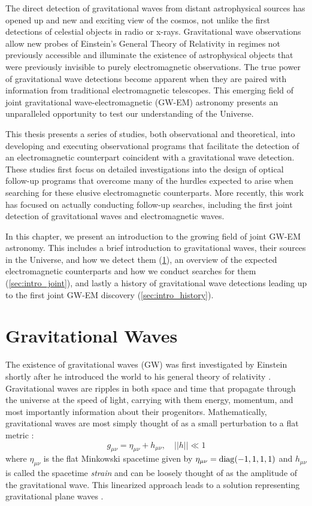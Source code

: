 The direct detection of gravitational waves from distant astrophysical sources has opened up and new and exciting view of the cosmos, not unlike the first detections of celestial objects in radio or x-rays. Gravitational wave observations allow new probes of Einstein's General Theory of Relativity in regimes not previously accessible and illuminate the existence of astrophysical objects that were previously invisible to purely electromagnetic observations. The true power of gravitational wave detections become apparent when they are paired with information from traditional electromagnetic telescopes. This emerging field of joint gravitational wave-electromagnetic (GW-EM) astronomy presents an unparalleled opportunity to test our understanding of the Universe.

This thesis presents a series of studies, both observational and theoretical, into developing and executing observational programs that facilitate the detection of an electromagnetic counterpart coincident with a gravitational wave detection. These studies first focus on detailed investigations into the design of optical follow-up programs that overcome many of the hurdles expected to arise when searching for these elusive electromagnetic counterparts. More recently, this work has focused on actually conducting follow-up searches, including the first joint detection of gravitational waves and electromagnetic waves.

In this chapter, we present an introduction to the growing field of joint GW-EM astronomy. This includes a brief introduction to gravitational waves, their sources in the Universe, and how we detect them (\cref{sec:intro_gw}), an overview of the expected electromagnetic counterparts and how we conduct searches for them (\cref{sec:intro_joint}), and lastly a history of gravitational wave detections leading up to the first joint GW-EM discovery (\cref{sec:intro_history}).

\section{Gravitational Waves}
\label{sec:intro_gw}
The existence of gravitational waves (GW) was first investigated by Einstein shortly after he introduced the world to his general theory of relativity \citep{Einstein1916}. Gravitational waves are ripples in both space and time that propagate through the universe at the speed of light, carrying with them energy, momentum, and most importantly information about their progenitors. Mathematically, gravitational waves are most simply thought of as a small perturbation to a flat metric \citep[$g_{\mu\nu}$; ][]{Misner+73,Carroll2004}:
\begin{equation}
\label{eq:intro_metric}
g_{\mu\nu} = \eta_{\mu\nu} + h_{\mu\nu}, \quad ||h|| \ll 1
\end{equation}
\noindent where $\eta_{\mu\nu}$ is the flat Minkowski spacetime given by $\eta_{\mu\nu} = {\rm diag}(-1, 1,1,1)$ and $h_{\mu\nu}$ is called the spacetime {\em strain} and can be loosely thought of as the amplitude of the gravitational wave. This linearized approach leads to a solution representing gravitational plane waves \citep[see e.g.,][and references therein]{Misner+73,Carroll2004}.

